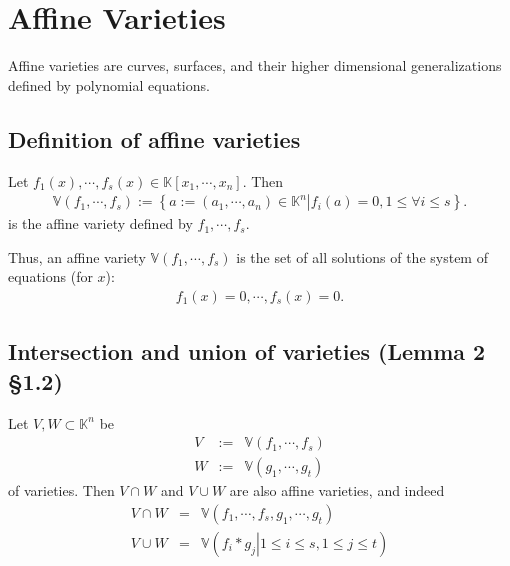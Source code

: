 \documentclass[11pt]{book}
\begin{document}

\section{Affine Varieties}
Affine varieties are curves, surfaces, and their higher dimensional generalizations defined by polynomial equations.

\subsection{Definition of affine varieties}
\label{DefOfAV}
Let $f_1(x), \cdots, f_s(x) \in \mathbb{K}[x_1,\cdots,x_n]$.
Then
\begin{eqnarray}
\mathbb{V}(f_1, \cdots, f_s) := \left\{\left. a := (a_1, \cdots, a_n) \in \mathbb{K}^n \right| f_i(a) = 0, 1 \leq \forall i \leq s \right\}.
\end{eqnarray}
is the affine variety defined by $f_1, \cdots, f_s$.

Thus, an affine variety $\mathbb{V}(f_1, \cdots, f_s)$ is the set of all solutions of the system of equations (for $x$):
\begin{eqnarray}
f_1(x) =0, \cdots, f_s(x) =0.
\end{eqnarray}

\subsection{Intersection and union of varieties (Lemma 2 \S1.2)}
\label{intersectionAndUnionOfVarieties}
Let $V, W \subset \mathbb{K}^n$ be 
\begin{eqnarray}
V &:=& \mathbb{V}(f_1, \cdots, f_s)\\
W &:=& \mathbb{V}(g_1, \cdots, g_t)
\end{eqnarray}
of varieties.
Then $V \cap W$ and $V \cup W$ are also affine varieties, and indeed
\begin{eqnarray}
V \cap W &=& \mathbb{V}(f_1, \cdots, f_s, g_1, \cdots, g_t) \\
V \cup W &=& \mathbb{V}\left( \left. f_i * g_j \right| 1 \leq i \leq s, 1 \leq j \leq t \right) 
\end{eqnarray}
\end{document}
